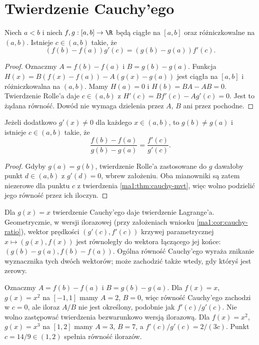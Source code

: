\section{Twierdzenie Cauchy'ego}
\begin{twierdzenie}
\label{ma1:thm:cauchy-mvt}
Niech $a<b$ i niech $f,g:[a,b]\to\R$ będą ciągłe na $[a,b]$ oraz różniczkowalne na $(a,b)$. Istnieje $c\in(a,b)$ takie, że
\[
 (f(b)-f(a))g'(c)=(g(b)-g(a))f'(c).
\]
\end{twierdzenie}
\begin{proof}
Oznaczmy $A=f(b)-f(a)$ i $B=g(b)-g(a)$. Funkcja $H(x)=B(f(x)-f(a))-A(g(x)-g(a))$ jest ciągła na $[a,b]$ i różniczkowalna na $(a,b)$. Mamy $H(a)=0$ i $H(b)=BA-AB=0$. Twierdzenie Rolle'a daje $c\in(a,b)$ z $H'(c)=Bf'(c)-Ag'(c)=0$. Jest to żądana równość. Dowód nie wymaga dzielenia przez $A$, $B$ ani przez pochodne.
\end{proof}
\begin{wniosek}
\label{ma1:cor:cauchy-ratio}
Jeżeli dodatkowo $g'(x)\ne0$ dla każdego $x\in(a,b)$, to $g(b)\ne g(a)$ i istnieje $c\in(a,b)$ takie, że
\[
 \frac{f(b)-f(a)}{g(b)-g(a)}=\frac{f'(c)}{g'(c)}.
\]
\end{wniosek}
\begin{proof}
Gdyby $g(a)=g(b)$, twierdzenie Rolle'a zastosowane do $g$ dawałoby punkt $d\in(a,b)$ z $g'(d)=0$, wbrew założeniu. Oba mianowniki są zatem niezerowe dla punktu $c$ z twierdzenia \ref{ma1:thm:cauchy-mvt}, więc wolno podzielić jego równość przez ich iloczyn.
\end{proof}
Dla $g(x)=x$ twierdzenie Cauchy'ego daje twierdzenie Lagrange'a. Geometrycznie, w wersji ilorazowej (przy założeniach wniosku \ref{ma1:cor:cauchy-ratio}), wektor prędkości $(g'(c),f'(c))$ krzywej parametrycznej $x\mapsto(g(x),f(x))$ jest równoległy do wektora łączącego jej końce: $(g(b)-g(a),f(b)-f(a))$. Ogólna równość Cauchy'ego wyraża znikanie wyznacznika tych dwóch wektorów; może zachodzić także wtedy, gdy któryś jest zerowy.
\begin{przyklad}
\label{ma1:ex:cauchy-degenerate}
Oznaczmy $A=f(b)-f(a)$ i $B=g(b)-g(a)$. Dla $f(x)=x$, $g(x)=x^2$ na $[-1,1]$ mamy $A=2$, $B=0$, więc równość Cauchy'ego zachodzi w $c=0$, ale iloraz $A/B$ nie jest określony, podobnie jak $f'(c)/g'(c)$. Nie wolno zastępować twierdzenia bezwarunkowo wersją ilorazową. Dla $f(x)=x^2$, $g(x)=x^3$ na $[1,2]$ mamy $A=3$, $B=7$, a $f'(c)/g'(c)=2/(3c)$. Punkt $c=14/9\in(1,2)$ spełnia równość ilorazów.
\end{przyklad}

